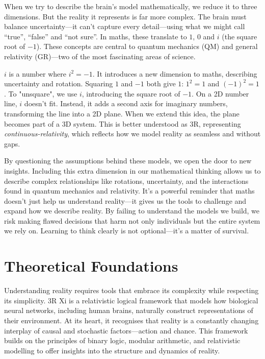 \documentclass[12pt]{article}
\begin{document}
When we try to describe the brain’s model mathematically, we reduce it to three dimensions. But the reality it represents is far more complex. The brain must balance uncertainty—it can’t capture every detail—using what we might call ``true'', ``false'' and ``not sure''. In maths, these translate to $1$, $0$ and $i$ (the square root of $-1$). These concepts are central to quantum mechanics (QM) and general relativity (GR)—two of the most fascinating areas of science.

$i$ is a number where $i^2 = -1$. It introduces a new dimension to maths, describing uncertainty and rotation. Squaring $1$ and $-1$ both give $1$: $1^2 = 1$ and $(-1)^2 = 1$. To "unsquare", we use $i$, introducing the square root of $-1$. On a 2D number line, $i$ doesn’t fit. Instead, it adds a second axis for imaginary numbers, transforming the line into a 2D plane. When we extend this idea, the plane becomes part of a 3D system. This is better understood as 3R, representing \emph{continuous-relativity}, which reflects how we model reality as seamless and without gaps.

By questioning the assumptions behind these models, we open the door to new insights. Including this extra dimension in our mathematical thinking allows us to describe complex relationships like rotations, uncertainty, and the interactions found in quantum mechanics and relativity. It’s a powerful reminder that maths doesn’t just help us understand reality—it gives us the tools to challenge and expand how we describe reality. By failing to understand the models we build, we risk making flawed decisions that harm not only individuals but the entire system we rely on. Learning to think clearly is not optional—it’s a matter of survival.

\section*{Theoretical Foundations}

Understanding reality requires tools that embrace its complexity while respecting its simplicity. 3R Xi is a relativistic logical framework that models how biological neural networks, including human brains, naturally construct representations of their environment. At its heart, it recognises that reality is a constantly changing interplay of causal and stochastic factors—action and chance. This framework builds on the principles of binary logic, modular arithmetic, and relativistic modelling to offer insights into the structure and dynamics of reality.
\end{document}
